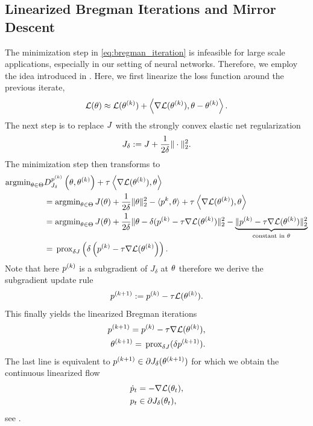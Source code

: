 \subsection{Linearized Bregman Iterations and Mirror Descent}
%
The minimization step in \cref{eq:bregman_iteration} is infeasible for large scale applications, especially in our setting of neural networks. Therefore, we employ the idea introduced in \cite{yin2008bregman, cai2009convergence}. Here, we first linearize the loss function around the previous iterate,
%
\begin{align*}
\mathcal{L}(\theta) \approx \mathcal{L}(\theta^{(k)}) + 
\left\langle \nabla\mathcal{L}(\theta^{(k)}), \theta - \theta^{(k)}
\right\rangle.
\end{align*} 
%
The next step is to replace $J$ with the strongly convex elastic net regularization%
\begin{align}\label{eq:elastic_net}
J_\delta:= J + \frac{1}{2\delta}\|\cdot\|^2_2.
\end{align}
%
The minimization step then transforms to
%
\begin{align}\label{eq:LinBregDer}
\argmin_{\param\in\Param} &D^{\sg^{(k)}}_{\func_\delta} \left(\param,\param^{(k)}\right) + \tau^{}\left\langle \nabla\empLoss(\param^{(k)}), \param
\right\rangle\\&= 
\argmin_{\param\in\Param}
J(\param) + \frac{1}{2\delta} \norm{\param}^{2}_2 - 
\langle \sg^{k}, \param\rangle +
\tau^{}\left\langle \nabla\empLoss(\param^{(k)}), \param
\right\rangle\nonumber\\
&=
\argmin_{\param\in\Param}
J(\param) + \frac{1}{2\delta} \norm{\param - \delta(\sg^{(k)} -\tau \nabla\empLoss(\param^{(k)})}^2_2 - \underbrace{\norm{\sg^{(k)} -\tau \nabla\empLoss(\param^{(k)})}^2_2}_{\text{constant in } \param}\nonumber\\
&=
\prox{\delta \func}\left(\delta\left(\sg^{(k)} -\tau \nabla\empLoss(\param^{(k)}\right)\right).\nonumber%
\end{align}
%
Note that here $p^{(k)}$ is a subgradient of $J_\delta$ at $\theta$ therefore we derive the subgradient update rule
%
\begin{align*}
p^{(k+1)} := p^{(k)} - \tau \mathcal{L}(\theta^{(k)}).
\end{align*}
%
This finally yields the linearized Bregman iterations
%
\begin{subequations}\label{eq:lin_bregman_iteration}
\begin{align}
p^{(k+1)} = p^{(k)} - \tau \nabla\mathcal{L}(\theta^{(k)}),\\
\theta^{(k+1)} = \,\mathrm{prox}_{\delta J}(\delta p^{(k+1)}).
\end{align}
\end{subequations}
%
%
The last line is equivalent to $p^{(k+1)}\in\partial J_\delta(\theta^{(k+1)})$ for which we obtain the continuous linearized flow
%
\begin{align*}
\dot{p}_t &= -\nabla \mathcal{L}(\theta_t),\\
p_t &\in \partial J_\delta(\theta_t),
\end{align*}
%
see \cite{burger2006nonlinear,burger2007inverse}.
%
%
